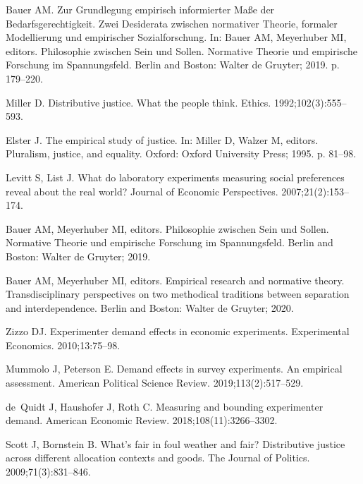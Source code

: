 \documentclass[10pt,letterpaper]{article}
\begin{document}
\begin{thebibliography}{100}
Bauer AM.
\newblock Zur {Grundlegung} empirisch informierter {Maße} der
  {Bedarfsgerechtigkeit}. {Zwei} {Desiderata} zwischen normativer {Theorie},
  formaler {Modellierung} und empirischer {Sozialforschung}.
\newblock In: Bauer AM, Meyerhuber MI, editors. Philosophie zwischen {Sein} und
  {Sollen}. {Normative} {Theorie} und empirische {Forschung} im
  {Spannungsfeld}. Berlin and Boston: Walter de Gruyter; 2019. p. 179--220.

Miller D.
\newblock Distributive justice. {What} the people think.
\newblock Ethics. 1992;102(3):555--593.

Elster J.
\newblock The empirical study of justice.
\newblock In: Miller D, Walzer M, editors. Pluralism, justice, and equality.
  Oxford: Oxford University Press; 1995. p. 81--98.

Levitt S, List J.
\newblock What do laboratory experiments measuring social preferences reveal
  about the real world?
\newblock Journal of Economic Perspectives. 2007;21(2):153--174.

Bauer AM, Meyerhuber MI, editors.
\newblock Philosophie zwischen {Sein} und {Sollen}. {Normative} {Theorie} und
  empirische {Forschung} im {Spannungsfeld}.
\newblock Berlin and Boston: Walter de Gruyter; 2019.

Bauer AM, Meyerhuber MI, editors.
\newblock Empirical research and normative theory. {Transdisciplinary}
  perspectives on two methodical traditions between separation and
  interdependence.
\newblock Berlin and Boston: Walter de Gruyter; 2020.

Zizzo DJ.
\newblock Experimenter demand effects in economic experiments.
\newblock Experimental Economics. 2010;13:75--98.

Mummolo J, Peterson E.
\newblock Demand effects in survey experiments. {An} empirical assessment.
\newblock American Political Science Review. 2019;113(2):517--529.

de~Quidt J, Haushofer J, Roth C.
\newblock Measuring and bounding experimenter demand.
\newblock American Economic Review. 2018;108(11):3266--3302.

Scott J, Bornstein B.
\newblock What's fair in foul weather and fair? {Distributive} justice across
  different allocation contexts and goods.
\newblock The Journal of Politics. 2009;71(3):831--846.


\end{thebibliography}
\end{document}
